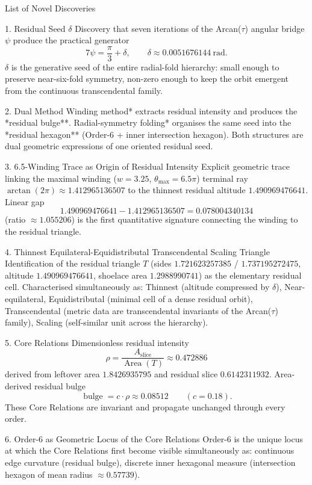 List of Novel Discoveries

1. Residual Seed \(\delta\)
Discovery that seven iterations of the Arcan(\(\tau\)) angular bridge \(\psi\) produce the practical generator
  \[
  7\psi=\frac{\pi}{3}+\delta,\qquad\delta\approx0.0051676144\ \mathrm{rad}.
  \]
\(\delta\) is the generative seed of the entire radial-fold hierarchy: small enough to preserve near-six-fold symmetry, non-zero enough to keep the orbit emergent from the continuous transcendental family.

2. Dual Method
Winding method* extracts residual intensity and produces the *residual bulge**.
Radial-symmetry folding* organises the same seed into the *residual hexagon** (Order-6 + inner intersection hexagon).
Both structures are dual geometric expressions of one oriented residual seed.

3. 6.5-Winding Trace as Origin of Residual Intensity
Explicit geometric trace linking the maximal winding (\(w=3.25\), \(\theta_{\max}=6.5\pi\)) terminal ray \(\arctan(2\pi)\approx1.412965136507\) to the thinnest residual altitude \(1.490969476641\).
Linear gap
  \[
  1.490969476641-1.412965136507=0.078004340134
  \]
  (ratio \(\approx1.055206\)) is the first quantitative signature connecting the winding to the residual triangle.

4. Thinnest Equilateral-Equidistributal Transcendental Scaling Triangle
Identification of the residual triangle \(T\) (sides \(1.721623257385\) / \(1.737195272475\), altitude \(1.490969476641\), shoelace area \(1.2988990741\)) as the elementary residual cell.
Characterised simultaneously as:
  Thinnest (altitude compressed by \(\delta\)),
  Near-equilateral,
  Equidistributal (minimal cell of a dense residual orbit),
  Transcendental (metric data are transcendental invariants of the Arcan(\(\tau\)) family),
  Scaling (self-similar unit across the hierarchy).

5. Core Relations
Dimensionless residual intensity
  \[
  \rho=\frac{A_{\mathrm{slice}}}{\operatorname{Area}(T)}\approx0.472886
  \]
  derived from leftover area \(1.8426935795\) and residual slice \(0.6142311932\).
Area-derived residual bulge
  \[
  \operatorname{bulge}=c\cdot\rho\approx0.08512\qquad(c=0.18).
  \]
These Core Relations are invariant and propagate unchanged through every order.

6. Order-6 as Geometric Locus of the Core Relations
Order-6 is the unique locus at which the Core Relations first become visible simultaneously as:
  continuous edge curvature (residual bulge),
  discrete inner hexagonal measure (intersection hexagon of mean radius \(\approx0.57739\)).

